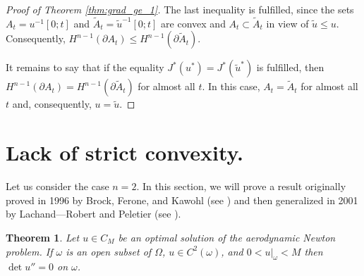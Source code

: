 \documentclass[14pt]{extarticle}
\renewcommand{\le}{\leqslant}
\newtheorem{thm}{Theorem}
\theoremstyle{remark}
\theoremstyle{definition}
\begin{document}
\begin{proof}[Proof of Theorem \ref{thm:grad_ge_1}]
	The last inequality is fulfilled, since the sets $A_t=u^{-1}[0;t]$ and $\tilde A_t=\tilde u^{-1}[0;t]$ are convex and $A_t\subset \tilde A_t$ in view of $\tilde u\le u$. Consequently, $H^{n-1}(\partial A_t)\le H^{n-1}(\partial\tilde A_t)$.

	It remains to say that if the equality $J^*(u^*)=J^*(\tilde u^*)$ is fulfilled, then $H^{n-1}(\partial A_t)=H^{n-1}(\partial\tilde A_t)$ for almost all $t$. In this case, $A_t=\tilde A_t$ for almost all $t$ and, consequently, $u=\tilde u$.

\end{proof}


\section{Lack of strict convexity.}
\label{sec:lack_of_strict_convexity}

Let us consider the case $n=2$. In this section, we will prove a result originally proved in 1996 by Brock, Ferone, and Kawohl (see \cite{Brock1996}) and then generalized in 2001 by Lachand---Robert and Peletier (see \cite{LachandCurvature}).

\begin{thm}
\label{thm:developable_surface}
	Let $u\in C_M$ be an optimal solution of the aerodynamic Newton problem. If $\omega$ is an open subset of $\Omega$, $u\in C^2(\omega)$, and $0<u|_{\omega}<M$ then $\det u''=0$ on $\omega$.
\end{thm}
\end{document}
